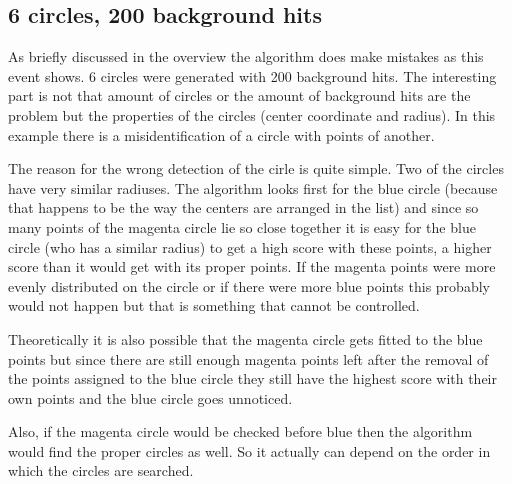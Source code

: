 \documentclass[11pt]{scrreprt}
\begin{document}

\subsection{6 circles, 200 background hits} %
\label{sub:2d_hough_transform_6_circles_200_background_hits}
As briefly discussed in the overview the algorithm does make mistakes as this event shows. 6 circles were generated with 200 background hits. The interesting part is not that amount of circles or the amount of background hits are the problem but the properties of the circles (center coordinate and radius). In this example there is a misidentification of a circle with points of another.

The reason for the wrong detection of the cirle is quite simple. Two of the circles have very similar radiuses. The algorithm looks first for the blue circle (because that happens to be the way the centers are arranged in the list) and since so many points of the magenta circle lie so close together it is easy for the blue circle (who has a similar radius) 
to get a high score with these points, a higher score than it would get with its proper points. If the magenta points were more evenly 
distributed on the circle or if there were more blue points this probably would not happen but that is something that cannot be controlled.

Theoretically it is also possible that the magenta circle gets fitted to the
blue points but since there are still enough magenta points left after the removal 
of the points assigned to the blue circle they still have the highest score with 
their own points and the blue circle goes unnoticed.

Also, if the magenta circle would be checked before blue then the algorithm
would find the proper circles as well. So it actually can depend on the order
in which the circles are searched.
\end{document}
